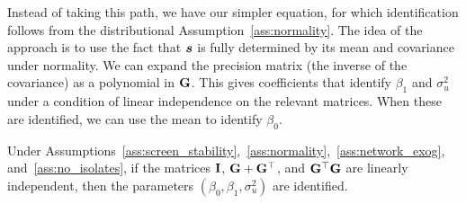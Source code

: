 Instead of taking this path, we have our simpler equation, for which identification follows from the distributional Assumption~\ref{ass:normality}. The idea of the approach is to use the fact that $\bm{s}$ is fully determined by its mean and covariance under normality. We can expand the precision matrix (the inverse of the covariance) as a polynomial in $\mathbf{G}$. This gives coefficients that identify $\beta_1$ and $\sigma_u^2$ under a condition of linear independence on the relevant matrices. When these are identified, we can use the mean to identify $\beta_0$.

\begin{proposition}
\label{prop:screen_identification}
Under Assumptions~\ref{ass:screen_stability},~\ref{ass:normality},~\ref{ass:network_exog}, and~\ref{ass:no_isolates}, if the matrices $\mathbf{I}$, $\mathbf{G} + \mathbf{G}^\top$, and $\mathbf{G}^\top\mathbf{G}$ are linearly independent, then the parameters $(\beta_0, \beta_1, \sigma_u^2)$ are identified.
\end{proposition}

